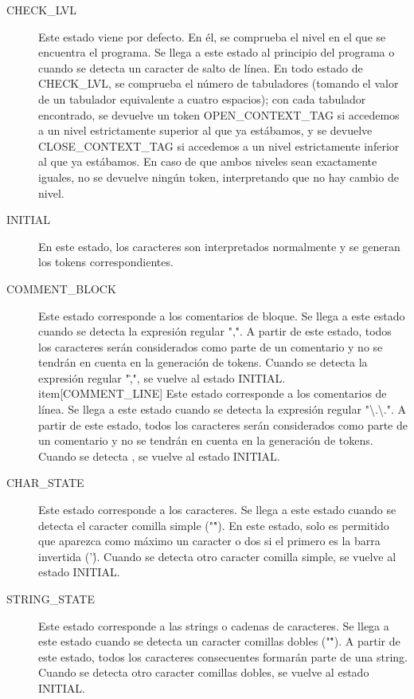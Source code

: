 \documentclass[11pt, english]{article}
\begin{document}
\begin{description}
	\item[CHECK\_LVL] Este estado viene por defecto. En él, se comprueba el nivel en el que se encuentra el programa. Se llega a este estado al principio del programa o cuando se detecta un caracter de salto de línea. En todo estado de CHECK\_LVL, se comprueba el número de tabuladores (tomando el valor de un tabulador equivalente a cuatro espacios); con cada tabulador encontrado, se devuelve un token OPEN\_CONTEXT\_TAG si accedemos a un nivel estrictamente superior al que ya estábamos, y se devuelve CLOSE\_CONTEXT\_TAG si accedemos a un nivel estrictamente inferior al que ya estábamos. En caso de que ambos niveles sean exactamente iguales, no se devuelve ningún token, interpretando que no hay cambio de nivel.
	\item[INITIAL] En este estado, los caracteres son interpretados normalmente y se generan los tokens correspondientes.
	\item[COMMENT\_BLOCK] Este estado corresponde a los comentarios de bloque. Se llega a este estado cuando se detecta la expresión regular ",\.". A partir de este estado, todos los caracteres serán considerados como parte de un comentario y no se tendrán en cuenta en la generación de tokens. Cuando se detecta la expresión regular "\.,", se vuelve al estado INITIAL.
	item[COMMENT\_LINE] Este estado corresponde a los comentarios de línea. Se llega a este estado cuando se detecta la expresión regular "\textbackslash{}.\textbackslash{}.". A partir de este estado, todos los caracteres serán considerados como parte de un comentario y no se tendrán en cuenta en la generación de tokens. Cuando se detecta , se vuelve al estado INITIAL.
	\item[CHAR\_STATE] Este estado corresponde a los caracteres. Se llega a este estado cuando se detecta el caracter comilla simple ("\'"). En este estado, solo es permitido que aparezca como máximo un caracter o dos si el primero es la barra invertida ('\'). Cuando se detecta otro caracter comilla simple, se vuelve al estado INITIAL.
	\item[STRING\_STATE] Este estado corresponde a las strings o cadenas de caracteres. Se llega a este estado cuando se detecta un caracter comillas dobles ("\""). A partir de este estado, todos los caracteres consecuentes formarán parte de una string. Cuando se detecta otro caracter comillas dobles, se vuelve al estado INITIAL.
\end{description}
\end{document}
